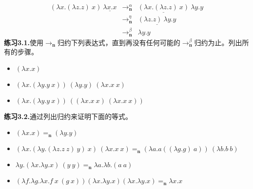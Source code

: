 \documentclass{book}
\def\n{\mathbf{n}}
\def\lianxi{\noindent \makebox[0pt][r]{$\rhd$} \textbf}
\begin{document}
$$
\begin{array}{lll}
(\lambda x.(\lambda z.z)\ x)\ \underline{\lambda x.x} & \rightarrow_\textbf{n}^\alpha & \underline{(\lambda x.(\lambda z.z)\ x)}\ \lambda y.y \\
& \rightarrow_\textbf{n}^\eta & \underline{(\lambda z.z)\ \lambda y.y} \\
& \rightarrow_\textbf{n}^\beta & \lambda y.y
\end{array}
$$
\lianxi{练习3.1.}使用$\rightarrow_\n$归约下列表达式，直到再没有任何可能的$\rightarrow^\beta_\n$归约为止。列出所有的步骤。
\begin{itemize}
 \item $(\lambda x.x)$
 \item $(\lambda x.(\lambda y.y\ x))\ (\lambda y.y)\ (\lambda x.x\ x)$
 \item $(\lambda x.(\lambda y.y\ x))\ ((\lambda x.x\ x)\ (\lambda x.x\ x))$
\end{itemize}
\lianxi{练习3.2.}通过列出归约来证明下面的等式。
\begin{itemize}
 \item $(\lambda x.x)=_\n(\lambda y.y)$
 \item $(\lambda x.(\lambda y.(\lambda z.z\ z)\ y)\ x)\ (\lambda x.x\ x)=_\n(\lambda a.a((\lambda g.g)\ a))\ (\lambda b.b\ b)$
 \item $\lambda y.(\lambda x.\lambda y.x)\ (y\ y)=_\n \lambda a.\lambda b.(a\ a)$
 \item $(\lambda f.\lambda g.\lambda x.f\ x\ (g\ x))(\lambda x.\lambda y.x)(\lambda x.\lambda y.x)=_\n \lambda x.x$
\end{itemize}
\end{document}
